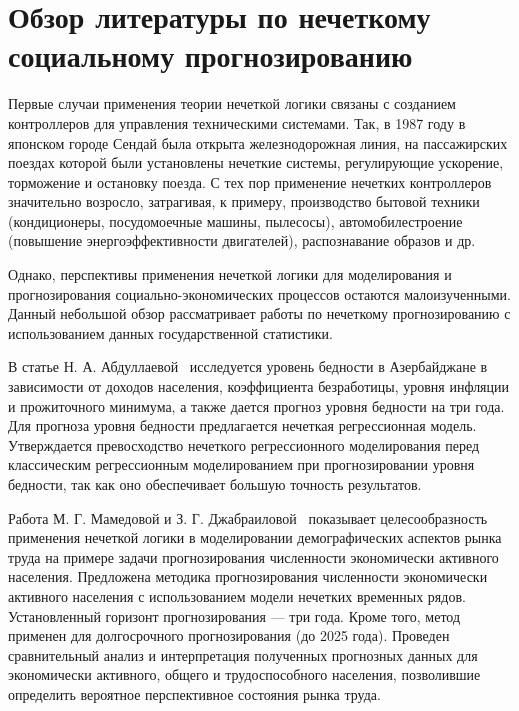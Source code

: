\section{Обзор литературы по нечеткому социальному прогнозированию}

Первые случаи применения теории нечеткой логики связаны с созданием контроллеров
для управления техническими системами. Так, в 1987 году в японском городе Сендай
была открыта железнодорожная линия, на пассажирских поездах которой были
установлены нечеткие системы, регулирующие ускорение, торможение и остановку
поезда. С тех пор применение нечетких контроллеров значительно возросло,
затрагивая, к примеру, производство бытовой техники (кондиционеры, посудомоечные
машины, пылесосы), автомобилестроение (повышение энергоэффективности
двигателей), распознавание образов и др.

Однако, перспективы применения нечеткой логики для моделирования и
прогнозирования социально-экономических процессов остаются малоизученными.
Данный небольшой обзор рассматривает работы по нечеткому прогнозированию с
использованием данных государственной статистики. 

В статье  Н. А. Абдуллаевой~\cite{Abdullaeva2010} исследуется уровень бедности в
Азербайджане в зависимости от доходов населения, коэффициента безработицы,
уровня инфляции и прожиточного минимума, а также дается прогноз уровня бедности
на три года. Для прогноза уровня бедности предлагается нечеткая регрессионная
модель. Утверждается превосходство нечеткого регрессионного моделирования перед
классическим регрессионным моделированием при прогнозировании уровня бедности,
так как оно обеспечивает большую точность результатов. 

Работа М. Г. Мамедовой и З. Г. Джабраиловой~\cite{Mamedova2005} показывает
целесообразность применения нечеткой логики в моделировании демографических
аспектов рынка труда на примере задачи прогнозирования численности экономически
активного населения. Предложена методика прогнозирования численности
экономически активного населения с использованием модели нечетких временных
рядов. Установленный горизонт прогнозирования --- три года. Кроме того, метод
применен для долгосрочного прогнозирования (до 2025 года). Проведен
сравнительный анализ и интерпретация полученных прогнозных данных для
экономически активного, общего и трудоспособного населения, позволившие
определить вероятное перспективное состояния рынка труда. 

